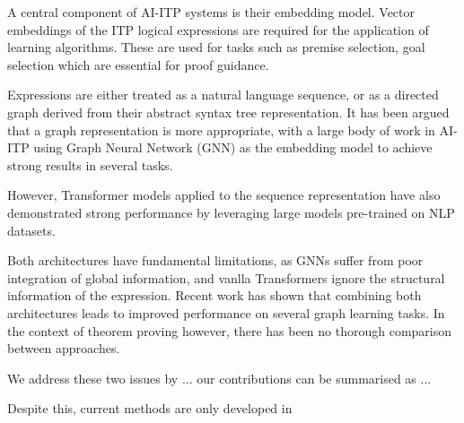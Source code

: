 \documentclass[letterpaper]{article} %
\begin{document}

    A central component of AI-ITP systems is their embedding model.
    Vector embeddings of the ITP logical expressions are required for the application of learning algorithms.
    These are used for tasks such as premise selection, goal selection which are essential for proof guidance.

    Expressions are either treated as a natural language sequence, or as a directed graph derived from their abstract syntax tree
    representation. It has been argued that a graph representation is more appropriate, with a large body of work in AI-ITP
    using Graph Neural Network (GNN) as the embedding model to achieve strong results in several tasks.

    However, Transformer models applied to the sequence representation have also demonstrated strong performance by
    leveraging large models pre-trained on NLP datasets.

    Both architectures have fundamental limitations, as GNNs suffer from poor integration of global information, and vanlla
    Transformers ignore the structural information of the expression.
    Recent work has shown that combining both architectures leads to improved performance on several graph learning tasks.
    In the context of theorem proving however, there has been no thorough comparison between approaches.

    We address these two issues by ... our contributions can be summarised as ...





    Despite this, current methods are only developed in
\end{document}
